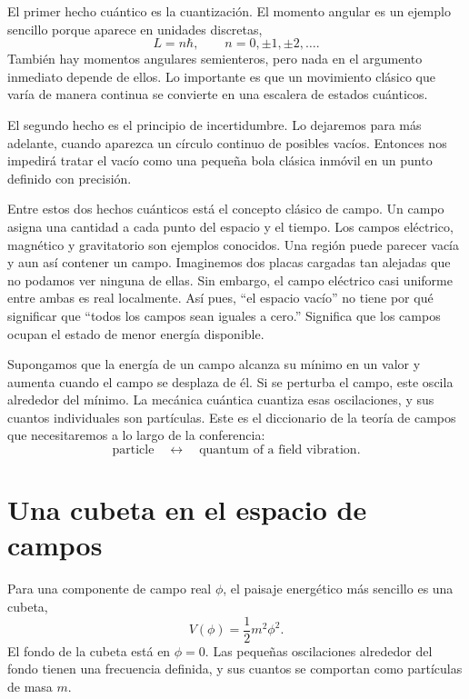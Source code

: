 El primer hecho cuántico es la cuantización. El momento angular es un ejemplo sencillo porque aparece en unidades discretas,
\begin{equation}
L=n\hbar,
\qquad
n=0,\pm1,\pm2,\ldots .
\end{equation}
También hay momentos angulares semienteros, pero nada en el argumento inmediato depende de ellos. Lo importante es que un movimiento clásico que varía de manera continua se convierte en una escalera de estados cuánticos.

El segundo hecho es el principio de incertidumbre. Lo dejaremos para más adelante, cuando aparezca un círculo continuo de posibles vacíos. Entonces nos impedirá tratar el vacío como una pequeña bola clásica inmóvil en un punto definido con precisión.

Entre estos dos hechos cuánticos está el concepto clásico de campo. Un campo asigna una cantidad a cada punto del espacio y el tiempo. Los campos eléctrico, magnético y gravitatorio son ejemplos conocidos. Una región puede parecer vacía y aun así contener un campo. Imaginemos dos placas cargadas tan alejadas que no podamos ver ninguna de ellas. Sin embargo, el campo eléctrico casi uniforme entre ambas es real localmente. Así pues, ``el espacio vacío'' no tiene por qué significar que ``todos los campos sean iguales a cero.'' Significa que los campos ocupan el estado de menor energía disponible.

Supongamos que la energía de un campo alcanza su mínimo en un valor y aumenta cuando el campo se desplaza de él. Si se perturba el campo, este oscila alrededor del mínimo. La mecánica cuántica cuantiza esas oscilaciones, y sus cuantos individuales son partículas. Este es el diccionario de la teoría de campos que necesitaremos a lo largo de la conferencia:
\begin{equation}
\text{particle}
\quad\longleftrightarrow\quad
\text{quantum of a field vibration}.
\end{equation}

\section{Una cubeta en el espacio de campos}

Para una componente de campo real $\phi$, el paisaje energético más sencillo es una cubeta,
\begin{equation}
V(\phi)=\frac{1}{2}m^{2}\phi^{2}.
\end{equation}
El fondo de la cubeta está en $\phi=0$. Las pequeñas oscilaciones alrededor del fondo tienen una frecuencia definida, y sus cuantos se comportan como partículas de masa $m$.


